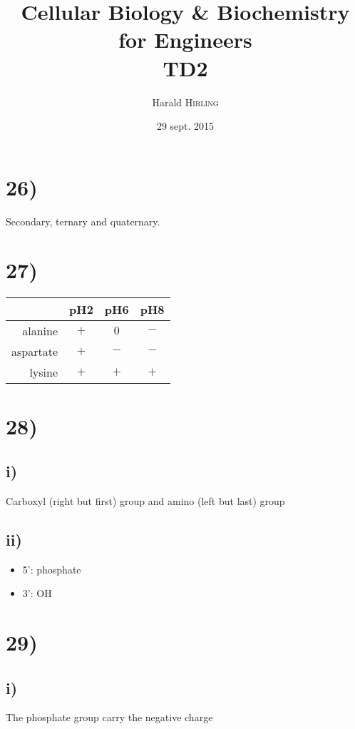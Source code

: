 

\title{Cellular Biology \& Biochemistry for Engineers\\TD2}
\author{Harald \textsc{Hirling}}
\date{29 sept. 2015}


\maketitle

\section*{26)}

Secondary, ternary and quaternary.

\section*{27)}

\begin{tabular}{r|ccc}
    & pH2 & pH6 & pH8\\
    \hline
    alanine & $+$ & $0$ & $-$ \\
    aspartate & $+$ & $-$ & $-$ \\
    lysine & $+$ & $+$ & $+$
\end{tabular}

\section*{28)}
    \subsection*{i)}
Carboxyl (right but first) group and amino (left but last) group

    \subsection*{ii)}
\begin{itemize}
    \item 5': phosphate
    \item 3': OH
\end{itemize}

\section*{29)}
    \subsection*{i)}
The phosphate group carry the negative charge

